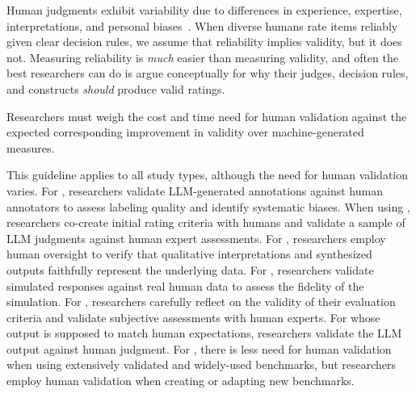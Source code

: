 Human judgments exhibit variability due to differences in experience, expertise, interpretations, and personal biases~\cite{DBLP:journals/pacmhci/McDonaldSF19}. When diverse humans rate items reliably given clear decision rules, we assume that reliability implies validity, but it does not. Measuring reliability is \textit{much} easier than measuring validity, and often the best researchers can do is argue conceptually for why their judges, decision rules, and constructs \textit{should} produce valid ratings.

Researchers must weigh the cost and time need for human validation against the expected corresponding improvement in validity over machine-generated measures. 


This guideline applies to all study types, although the need for human validation varies.
For \annotators, researchers \should validate LLM-generated annotations against human annotators to assess labeling quality and identify systematic biases.
When using \judges, researchers \should co-create initial rating criteria with humans and validate a sample of LLM judgments against human expert assessments.
For \synthesis, researchers \should employ human oversight to verify that qualitative interpretations and synthesized outputs faithfully represent the underlying data.
For \subjects, researchers \should validate simulated responses against real human data to assess the fidelity of the simulation.
For \llmusage, researchers \should carefully reflect on the validity of their evaluation criteria and validate subjective assessments with human experts.
For \newtools whose output is supposed to match human expectations, researchers \should validate the LLM output against human judgment.
For \benchmarkingtasks, there is less need for human validation when using extensively validated and widely-used benchmarks, but researchers \should employ human validation when creating or adapting new benchmarks.


